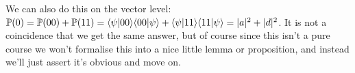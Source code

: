 \documentclass[10pt,a4paper]{article}
\begin{document}
We can also do this on the vector level: $\mathbb{P}(0) = \mathbb{P}(00) + \mathbb{P}(11) = \langle \psi | 00 \rangle\langle 00 | \psi \rangle + \langle \psi | 11 \rangle\langle 11 | \psi \rangle = |a|^2+|d|^2$. It is not a coincidence that we get the same answer, but of course since this isn't a pure course we won't formalise this into a nice little lemma or proposition, and instead we'll just assert it's obvious and move on.
\end{document}
